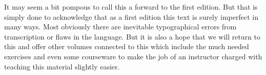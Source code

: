It may seem a bit pompous to call this a forward to the first edition. But that is simply done to acknowledge that as a first edition this text is surely imperfect in many ways. Most obviously there are inevitable typographical errors from transcription or flaws in the language. But it is also a hope that we will return to this and offer other volumes connected to this which include the much needed exercises and even some courseware to make the job of an instructor charged with teaching this material slightly easier.
